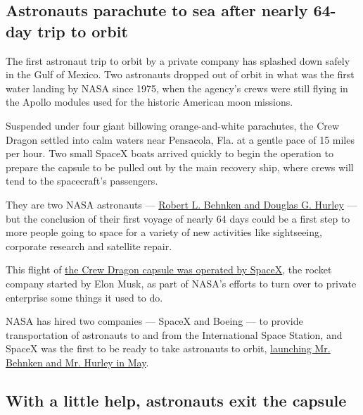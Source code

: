 \hypertarget{astronauts-parachute-to-sea-after-nearly-64-day-trip-to-orbit}{%
\subsection{Astronauts parachute to sea after nearly 64-day trip to
orbit}\label{astronauts-parachute-to-sea-after-nearly-64-day-trip-to-orbit}}

The first astronaut trip to orbit by a private company has splashed down
safely in the Gulf of Mexico. Two astronauts dropped out of orbit in
what was the first water landing by NASA since 1975, when the agency's
crews were still flying in the Apollo modules used for the historic
American moon missions.

Suspended under four giant billowing orange-and-white parachutes, the
Crew Dragon settled into calm waters near Pensacola, Fla. at a gentle
pace of 15 miles per hour. Two small SpaceX boats arrived quickly to
begin the operation to prepare the capsule to be pulled out by the main
recovery ship, where crews will tend to the spacecraft's passengers.

They are two NASA astronauts ---
\href{https://www.nytimes.com/2020/05/27/science/bob-behnken-doug-hurley.html}{Robert
L. Behnken and Douglas G. Hurley} --- but the conclusion of their first
voyage of nearly 64 days could be a first step to more people going to
space for a variety of new activities like sightseeing, corporate
research and satellite repair.

This flight of
\href{https://www.nytimes.com/interactive/2020/05/26/science/spacex-nasa.html}{the
Crew Dragon capsule was operated by SpaceX}, the rocket company started
by Elon Musk, as part of NASA's efforts to turn over to private
enterprise some things it used to do.

NASA has hired two companies --- SpaceX and Boeing --- to provide
transportation of astronauts to and from the International Space
Station, and SpaceX was the first to be ready to take astronauts to
orbit,
\href{https://www.nytimes.com/2020/05/30/science/spacex-nasa-astronauts.html}{launching
Mr. Behnken and Mr. Hurley in May}.

\hypertarget{with-a-little-help-astronauts-exit-the-capsule}{%
\subsection{With a little help, astronauts exit the
capsule}\label{with-a-little-help-astronauts-exit-the-capsule}}


